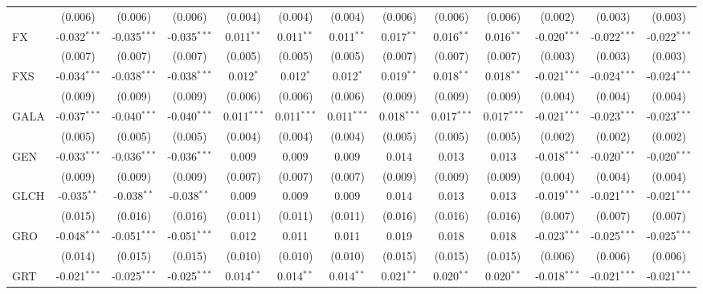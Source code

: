 \begin{table}[!htbp]
\begin{tabular}{@{\extracolsep{5pt}}lcccccccccccc}
  & (0.006) & (0.006) & (0.006) & (0.004) & (0.004) & (0.004) & (0.006) & (0.006) & (0.006) & (0.002) & (0.003) & (0.003) \\
 FX & -0.032$^{***}$ & -0.035$^{***}$ & -0.035$^{***}$ & 0.011$^{**}$ & 0.011$^{**}$ & 0.011$^{**}$ & 0.017$^{**}$ & 0.016$^{**}$ & 0.016$^{**}$ & -0.020$^{***}$ & -0.022$^{***}$ & -0.022$^{***}$ \\
  & (0.007) & (0.007) & (0.007) & (0.005) & (0.005) & (0.005) & (0.007) & (0.007) & (0.007) & (0.003) & (0.003) & (0.003) \\
 FXS & -0.034$^{***}$ & -0.038$^{***}$ & -0.038$^{***}$ & 0.012$^{*}$ & 0.012$^{*}$ & 0.012$^{*}$ & 0.019$^{**}$ & 0.018$^{**}$ & 0.018$^{**}$ & -0.021$^{***}$ & -0.024$^{***}$ & -0.024$^{***}$ \\
  & (0.009) & (0.009) & (0.009) & (0.006) & (0.006) & (0.006) & (0.009) & (0.009) & (0.009) & (0.004) & (0.004) & (0.004) \\
 GALA & -0.037$^{***}$ & -0.040$^{***}$ & -0.040$^{***}$ & 0.011$^{***}$ & 0.011$^{***}$ & 0.011$^{***}$ & 0.018$^{***}$ & 0.017$^{***}$ & 0.017$^{***}$ & -0.021$^{***}$ & -0.023$^{***}$ & -0.023$^{***}$ \\
  & (0.005) & (0.005) & (0.005) & (0.004) & (0.004) & (0.004) & (0.005) & (0.005) & (0.005) & (0.002) & (0.002) & (0.002) \\
 GEN & -0.033$^{***}$ & -0.036$^{***}$ & -0.036$^{***}$ & 0.009$^{}$ & 0.009$^{}$ & 0.009$^{}$ & 0.014$^{}$ & 0.013$^{}$ & 0.013$^{}$ & -0.018$^{***}$ & -0.020$^{***}$ & -0.020$^{***}$ \\
  & (0.009) & (0.009) & (0.009) & (0.007) & (0.007) & (0.007) & (0.009) & (0.009) & (0.009) & (0.004) & (0.004) & (0.004) \\
 GLCH & -0.035$^{**}$ & -0.038$^{**}$ & -0.038$^{**}$ & 0.009$^{}$ & 0.009$^{}$ & 0.009$^{}$ & 0.014$^{}$ & 0.013$^{}$ & 0.013$^{}$ & -0.019$^{***}$ & -0.021$^{***}$ & -0.021$^{***}$ \\
  & (0.015) & (0.016) & (0.016) & (0.011) & (0.011) & (0.011) & (0.016) & (0.016) & (0.016) & (0.007) & (0.007) & (0.007) \\
 GRO & -0.048$^{***}$ & -0.051$^{***}$ & -0.051$^{***}$ & 0.012$^{}$ & 0.011$^{}$ & 0.011$^{}$ & 0.019$^{}$ & 0.018$^{}$ & 0.018$^{}$ & -0.023$^{***}$ & -0.025$^{***}$ & -0.025$^{***}$ \\
  & (0.014) & (0.015) & (0.015) & (0.010) & (0.010) & (0.010) & (0.015) & (0.015) & (0.015) & (0.006) & (0.006) & (0.006) \\
 GRT & -0.021$^{***}$ & -0.025$^{***}$ & -0.025$^{***}$ & 0.014$^{**}$ & 0.014$^{**}$ & 0.014$^{**}$ & 0.021$^{**}$ & 0.020$^{**}$ & 0.020$^{**}$ & -0.018$^{***}$ & -0.021$^{***}$ & -0.021$^{***}$ \\

\end{tabular}
\end{table}
